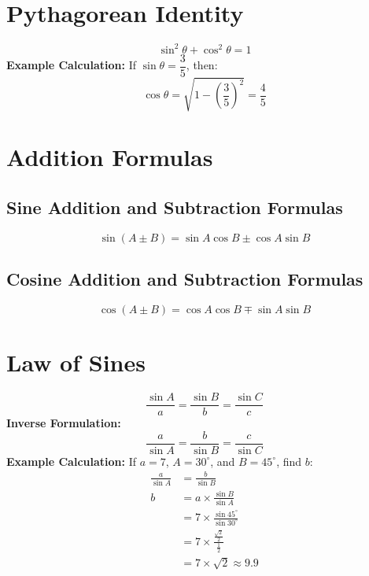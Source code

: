 \documentclass{article}
\begin{document}
\begin{multicols}{2}
\begin{center}
\end{center}

\section*{Pythagorean Identity}
\[
\sin^2 \theta + \cos^2 \theta = 1
\]
\textbf{Example Calculation:} If \( \sin \theta = \dfrac{3}{5} \), then:
\[
\cos \theta = \sqrt{1 - \left( \dfrac{3}{5} \right)^2} = \dfrac{4}{5}
\]

\columnbreak

\section*{Addition Formulas}

\subsection*{Sine Addition and Subtraction Formulas}
\[
\sin(A \pm B) = \sin A \cos B \pm \cos A \sin B
\]

\subsection*{Cosine Addition and Subtraction Formulas}
\[
\cos(A \pm B) = \cos A \cos B \mp \sin A \sin B
\]

\section*{Law of Sines}
\begin{center}
\end{center}
\[
\frac{\sin A}{a} = \frac{\sin B}{b} = \frac{\sin C}{c}
\]
\textbf{Inverse Formulation:}
\[
\frac{a}{\sin A} = \frac{b}{\sin B} = \frac{c}{\sin C}
\]
\textbf{Example Calculation:} If \( a = 7 \), \( A = 30^\circ \), and \( B = 45^\circ \), find \( b \):
\begin{align*}
\frac{a}{\sin A} &= \frac{b}{\sin B} \\
b &= a \times \frac{\sin B}{\sin A} \\
&= 7 \times \frac{\sin 45^\circ}{\sin 30^\circ} \\
&= 7 \times \frac{\frac{\sqrt{2}}{2}}{\frac{1}{2}} \\
&= 7 \times \sqrt{2} \approx 9.9
\end{align*}


\end{multicols}
\end{document}
